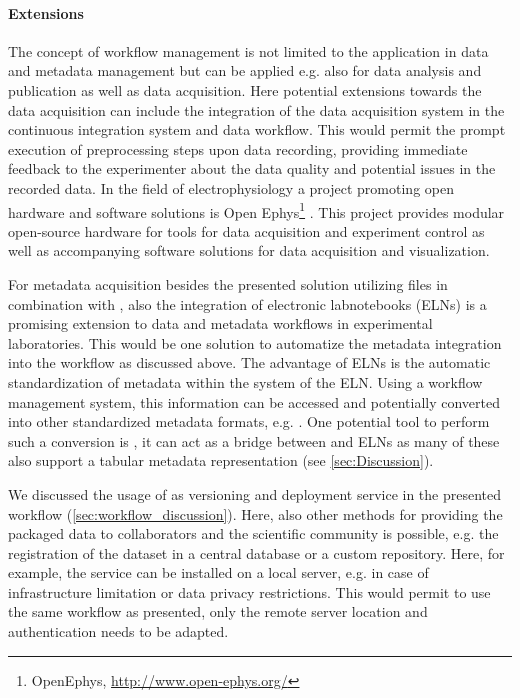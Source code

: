 \paragraph{Extensions}
The concept of workflow management is not limited to the application in data and metadata management but can be applied e.g. also for data analysis and publication as well as data acquisition.
Here potential extensions towards the data acquisition can include the integration of the data acquisition system in the continuous integration system and data workflow. This would permit the prompt execution of preprocessing steps upon data recording, providing immediate feedback to the experimenter about the data quality and potential issues in the recorded data. In the field of electrophysiology a project promoting open hardware and software solutions is Open Ephys\footnote{OpenEphys, \url{http://www.open-ephys.org/}} \citep{Siegle_2017}. This project provides modular open-source hardware for tools for data acquisition and experiment control as well as accompanying software solutions for data acquisition and visualization.

For metadata acquisition besides the presented solution utilizing  files in combination with , also the integration of electronic labnotebooks (ELNs) is a promising extension to data and metadata workflows in experimental laboratories. This would be one solution to automatize the metadata integration into the workflow as discussed above. The advantage of ELNs is the automatic standardization of metadata within the system of the ELN. Using a workflow management system, this information can be accessed and potentially converted into other standardized metadata formats, e.g. . One potential tool to perform such a conversion is , it can act as a bridge between  and ELNs as many of these also support a tabular metadata representation (see \cref{sec:Discussion}).

We discussed the usage of  as versioning and deployment service in the presented workflow (\ref{sec:workflow_discussion}). Here, also other methods for providing the packaged data to collaborators and the scientific community is possible, e.g. the registration of the dataset in a central database or a custom repository. Here, for example, the  service can be installed on a local server, e.g. in case of infrastructure limitation or data privacy restrictions. This would permit to use the same workflow as presented, only the remote server location and authentication needs to be adapted. 

